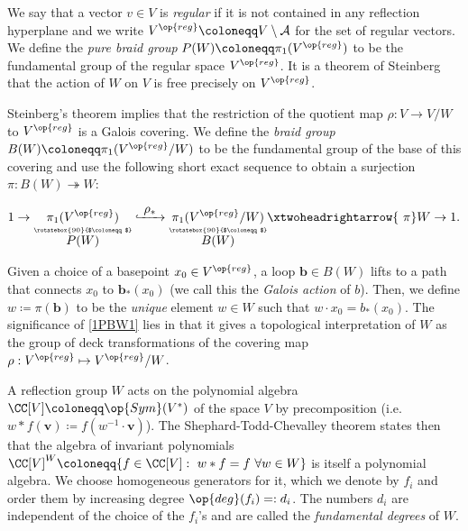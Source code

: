 We say that a vector $v\in V$ is {\it regular} if it is not contained in any reflection hyperplane and we write $V^{\op{reg}}\coloneqq V\setminus \mathcal{A}$ for the set of regular vectors. We define the {\it pure braid group} $P(W)\coloneqq \pi_1(V^{\op{reg}})$ to be the fundamental group of the regular space $V^{\op{reg}}$. It is a theorem of Steinberg that the action of $W$ on $V$ is free precisely on $V^{\op{reg}}$. 

Steinberg's theorem \cite[\S~4.2.3]{broue-book-braid-groups} implies that the restriction of the quotient map $\rho: V\rightarrow V/W$ to $V^{\op{reg}}$ is a Galois covering. We define the {\it \color{blue} braid group} $B(W)\coloneqq \pi_1(V^{\op{reg}}/W)$ to be the fundamental group of the base of this covering and use the following short exact sequence \cite[(2.10)]{broue-malle-rouquier-braid-hecke} to obtain a surjection $\pi:B(W)\twoheadrightarrow W$:

\begin{equation}\label{1PBW1}
1\rightarrow\underset{\overset{\rotatebox{90}{$\coloneqq$}}{\displaystyle P(W)}}{\pi_1(V^{\op{reg}})}\lhook\joinrel\xrightarrow{\ \displaystyle \rho_*\ }
\underset{\overset{\rotatebox{90}{$\coloneqq$}}{\displaystyle B(W)}}{\pi_1(V^{\op{reg}}/W)}
\xtwoheadrightarrow{\ \displaystyle \pi} W\rightarrow 1.
\end{equation}


Given a choice of a basepoint $x_0\in V^{\op{reg}}$, a loop $\bm b\in B(W)$ lifts to a path that connects $x_0$ to $\bm b_*(x_0)$ (we call this the {\it Galois action} of $b$). Then, we define $w\coloneqq \pi(\bm b)$ to be the {\it unique} element $w\in W$ such that $w\cdot x_0=b_*(x_0)$. The significance of \eqref{1PBW1} lies in that it gives a topological interpretation of $W$ as the group of deck transformations of the covering map $\rho:V^{\op{reg}}\mapsto V^{\op{reg}}/W$.

A reflection group $W$ acts on the polynomial algebra $\CC[V]\coloneqq \op{Sym}(V^*)$ of the  space $V$ by precomposition (i.e. $w*f(\bm v)\coloneqq f(w^{-1}\cdot \bm v)$). The Shephard-Todd-Chevalley theorem \cite{shephard-and-todd,chevalley-improves-Shep-and-Todd} states then that the algebra of invariant polynomials $\CC[V]^W\coloneqq \{f\in\CC[V]:\ w*f=f\ \forall w\in W\}$ is itself a polynomial algebra. We choose homogeneous generators for it, which we denote by $f_i$ and order them by increasing degree $\op{deg}(f_i)=:d_i$. The numbers $d_i$ are independent of the choice of the $f_i$'s and are called the {\it \color{blue} fundamental degrees} of $W$.

